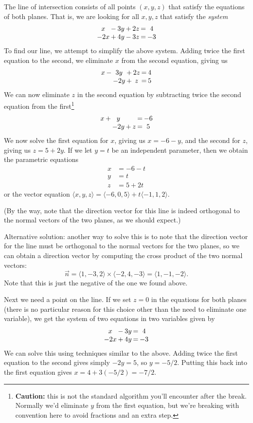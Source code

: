 \documentclass[12pt]{article}
\begin{document}
\begin{enumerate}
The line of intersection consists of all points $(x,y,z)$ that satisfy the equations of both planes. That is, we are looking for all $x,y,z$ that satisfy the \textit{system}
\[\arraycolsep1pt
\begin{array}{ccccccc}
x&-&3y&+&2z&=&4\\
-2x&+&4y&-&3z&=&-3
\end{array}
\]
To find our line, we attempt to simplify the above system. Adding twice the first equation to the second, we eliminate $x$ from the second equation, giving us
\[\arraycolsep1pt
\begin{array}{ccccccc}
x&-&3y&+&2z&=&4\\
& &-2y&+&z&=&5
\end{array}
\]
We can now eliminate $z$ in the second equation by subtracting twice the second equation from the first\footnote{\textbf{Caution:} this is not the standard algorithm you'll encounter after the break. Normally we'd eliminate $y$ from the first equation, but we're breaking with convention here to avoid fractions and an extra step.}
\[\arraycolsep1pt
\begin{array}{ccccccc}
x&+&y&&&=&-6\\
& &-2y&+&z&=&5
\end{array}
\]
 We now solve the first equation for $x$, giving us $x=-6-y$, and the second for $z$, giving us $z=5+2y$. If we let $y=t$ be an independent parameter, then we obtain the parametric equations
 \begin{align*}
 x&=-6-t\\
 y&=t\\
 z&=5+2t
 \end{align*}
 or the vector equation $\langle x,y,z\rangle = \langle -6,0,5\rangle +t\langle -1,1,2\rangle$.
 
 (By the way, note that the direction vector for this line is indeed orthogonal to the normal vectors of the two planes, as we should expect.)
 
 \bigskip
 
 Alternative solution: another way to solve this is to note that the direction vector for the line must be orthogonal to the normal vectors for the two planes, so we can obtain a direction vector by computing the cross product of the two normal vectors:
 \[
 \vec{n} = \langle 1,-3,2\rangle\times\langle -2,4,-3\rangle = \langle 1, -1,-2\rangle.
 \]
 Note that this is just the negative of the one we found above.
 
 Next we need a point on the line. If we set $z=0$ in the equations for both planes (there is no particular reason for this choice other than the need to eliminate one variable), we get the system of two equations in two variables given by
 \[\arraycolsep1pt
\begin{array}{ccccc}
x&-&3y&=&4\\
-2x&+&4y&=&-3
\end{array}
\]
We can solve this using techniques similar to the above. Adding twice the first equation to the second gives simply $-2y=5$, so $y=-5/2$. Putting this back into the first equation gives $x=4+3(-5/2)=-7/2$.


\end{enumerate}
\end{document}
